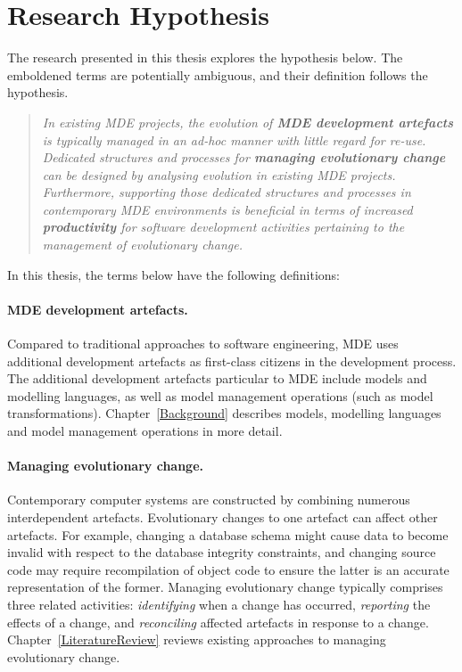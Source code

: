 
\section{Research Hypothesis}
\label{sec:hypothesis}

The research presented in this thesis explores the hypothesis below. The emboldened terms are potentially ambiguous, and their definition follows the hypothesis.

\begin{quote}
\emph{In existing MDE projects, the evolution of \textbf{MDE development artefacts} is typically managed in an ad-hoc manner with little regard for re-use. Dedicated structures and processes for \textbf{managing evolutionary change} can be designed by analysing evolution in existing MDE projects. Furthermore, supporting those dedicated structures and processes in contemporary MDE environments is beneficial in terms of increased \textbf{productivity} for software development activities pertaining to the management of evolutionary change.}
\end{quote}

In this thesis, the terms below have the following definitions:

\paragraph{MDE development artefacts.} Compared to traditional approaches to software engineering, MDE uses additional development artefacts as first-class citizens in the development process. The additional development artefacts particular to MDE include models and modelling languages, as well as model management operations (such as model transformations). Chapter~\ref{Background} describes models, modelling languages and model management operations in more detail.

\paragraph{Managing evolutionary change.} Contemporary computer systems are constructed by combining numerous interdependent artefacts. Evolutionary changes to one artefact can affect other artefacts. For example, changing a database schema might cause data to become invalid with respect to the database integrity constraints, and changing source code may require recompilation of object code to ensure the latter is an accurate representation of the former. Managing evolutionary change typically comprises three related activities: \emph{identifying} when a change has occurred, \emph{reporting} the effects of a change, and \emph{reconciling} affected artefacts in response to a change. Chapter~\ref{LiteratureReview} reviews existing approaches to managing evolutionary change.

